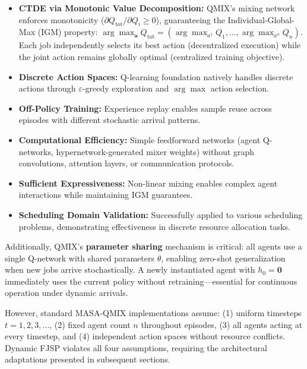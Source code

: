 \begin{itemize}
\item \textbf{CTDE via Monotonic Value Decomposition:} QMIX's mixing network enforces monotonicity (\( \partial Q_{\text{tot}} / \partial Q_i \geq 0 \)), guaranteeing the Individual-Global-Max (IGM) property: \( \arg\max_{\mathbf{a}} Q_{\text{tot}} = (\arg\max_{a^1} Q_1, \ldots, \arg\max_{a^n} Q_n) \). Each job independently selects its best action (decentralized execution) while the joint action remains globally optimal (centralized training objective).

\item \textbf{Discrete Action Spaces:} Q-learning foundation natively handles discrete actions through \( \varepsilon \)-greedy exploration and \( \arg\max \) action selection.

\item \textbf{Off-Policy Training:} Experience replay enables sample reuse across episodes with different stochastic arrival patterns.

\item \textbf{Computational Efficiency:} Simple feedforward networks (agent Q-networks, hypernetwork-generated mixer weights) without graph convolutions, attention layers, or communication protocols.

\item \textbf{Sufficient Expressiveness:} Non-linear mixing enables complex agent interactions while maintaining IGM guarantees.

\item \textbf{Scheduling Domain Validation:} Successfully applied to various scheduling problems, demonstrating effectiveness in discrete resource allocation tasks.
\end{itemize}

Additionally, QMIX's \textbf{parameter sharing} mechanism is critical: all agents use a single Q-network with shared parameters \( \theta \), enabling zero-shot generalization when new jobs arrive stochastically. A newly instantiated agent with \( h_0 = \mathbf{0} \) immediately uses the current policy without retraining—essential for continuous operation under dynamic arrivals.

However, standard MASA-QMIX implementations assume: (1) uniform timesteps \( t = 1, 2, 3, \ldots \), (2) fixed agent count \( n \) throughout episodes, (3) all agents acting at every timestep, and (4) independent action spaces without resource conflicts. Dynamic FJSP violates all four assumptions, requiring the architectural adaptations presented in subsequent sections.


